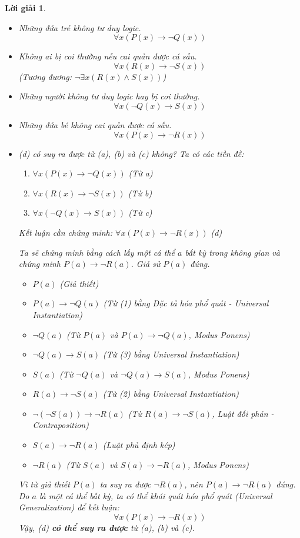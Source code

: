\documentclass[11pt, oneside, a4paper]{article}
\newtheorem{loigiai}{Lời giải}[bt]
\begin{document}
    \begin{loigiai}
    \begin{itemize}
        \item[a)] Những đứa trẻ không tư duy logic.
            $$ \forall x (P(x) \rightarrow \lnot Q(x)) $$
        \item[b)] Không ai bị coi thường nếu cai quản được cá sấu.
            $$ \forall x (R(x) \rightarrow \lnot S(x)) $$
            (Tương đương: $\lnot \exists x (R(x) \land S(x))$)
        \item[c)] Những người không tư duy logic hay bị coi thường.
            $$ \forall x (\lnot Q(x) \rightarrow S(x)) $$
        \item[d)] Những đứa bé không cai quản được cá sấu.
            $$ \forall x (P(x) \rightarrow \lnot R(x)) $$
        \item[e)] (d) có suy ra được từ (a), (b) và (c) không?
        Ta có các tiền đề:
        \begin{enumerate}
            \item $\forall x (P(x) \rightarrow \lnot Q(x))$ (Từ a)
            \item $\forall x (R(x) \rightarrow \lnot S(x))$ (Từ b)
            \item $\forall x (\lnot Q(x) \rightarrow S(x))$ (Từ c)
        \end{enumerate}
        Kết luận cần chứng minh: $\forall x (P(x) \rightarrow \lnot R(x))$ (d)
    
        Ta sẽ chứng minh bằng cách lấy một cá thể $a$ bất kỳ trong không gian và chứng minh $P(a) \rightarrow \lnot R(a)$.
        Giả sử $P(a)$ đúng.
        \begin{itemize}
            \item $P(a)$ (Giả thiết)
            \item $P(a) \rightarrow \lnot Q(a)$ (Từ (1) bằng Đặc tả hóa phổ quát - Universal Instantiation)
            \item $\lnot Q(a)$ (Từ $P(a)$ và $P(a) \rightarrow \lnot Q(a)$, Modus Ponens)
            \item $\lnot Q(a) \rightarrow S(a)$ (Từ (3) bằng Universal Instantiation)
            \item $S(a)$ (Từ $\lnot Q(a)$ và $\lnot Q(a) \rightarrow S(a)$, Modus Ponens)
            \item $R(a) \rightarrow \lnot S(a)$ (Từ (2) bằng Universal Instantiation)
            \item $\lnot (\lnot S(a)) \rightarrow \lnot R(a)$ (Từ $R(a) \rightarrow \lnot S(a)$, Luật đối phản - Contraposition)
            \item $S(a) \rightarrow \lnot R(a)$ (Luật phủ định kép)
            \item $\lnot R(a)$ (Từ $S(a)$ và $S(a) \rightarrow \lnot R(a)$, Modus Ponens)
        \end{itemize}
        Vì từ giả thiết $P(a)$ ta suy ra được $\lnot R(a)$, nên $P(a) \rightarrow \lnot R(a)$ đúng.
        Do $a$ là một cá thể bất kỳ, ta có thể khái quát hóa phổ quát (Universal Generalization) để kết luận:
        $$ \forall x (P(x) \rightarrow \lnot R(x)) $$
        Vậy, (d) \textbf{có thể suy ra được} từ (a), (b) và (c).
    \end{itemize}
    \end{loigiai}
\end{document}
